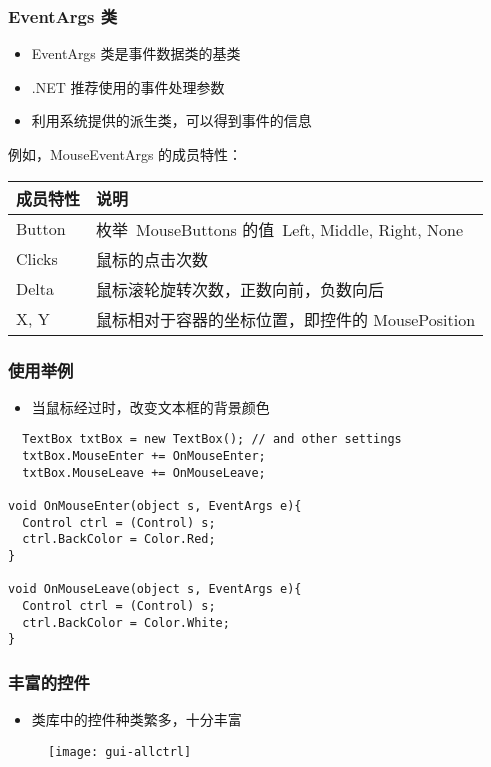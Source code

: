 \begin{frame}
\frametitle{EventArgs 类}
\begin{itemize}
\item EventArgs 类是事件数据类的基类
\item .NET 推荐使用的事件处理参数
\item 利用系统提供的派生类，可以得到事件的信息
\end{itemize}
\medskip

例如，MouseEventArgs 的成员特性：

\begin{tabular}{l|l}
\hline
成员特性 & 说明                                             \\  
\hline
Button   & 枚举~MouseButtons 的值~Left, Middle, Right, None \\
Clicks   & 鼠标的点击次数                                   \\
Delta    & 鼠标滚轮旋转次数，正数向前，负数向后             \\
X, Y     & 鼠标相对于容器的坐标位置，即控件的 MousePosition \\
\hline
\end{tabular}
\end{frame}

\begin{frame}[fragile]
\frametitle{使用举例}
\begin{itemize}
\item 当鼠标经过时，改变文本框的背景颜色
\end{itemize}
\begin{lstlisting}
  TextBox txtBox = new TextBox(); // and other settings
  txtBox.MouseEnter += OnMouseEnter;
  txtBox.MouseLeave += OnMouseLeave;

void OnMouseEnter(object s, EventArgs e){
  Control ctrl = (Control) s;
  ctrl.BackColor = Color.Red;
}

void OnMouseLeave(object s, EventArgs e){
  Control ctrl = (Control) s;
  ctrl.BackColor = Color.White;
}

\end{lstlisting}
\end{frame}

\begin{frame}
\frametitle{丰富的控件}
\begin{itemize}
\item 类库中的控件种类繁多，十分丰富
\end{itemize}
\begin{figure}[htbp]
  \centering
  \texttt{[image: gui-allctrl]}
\end{figure}
\end{frame}

